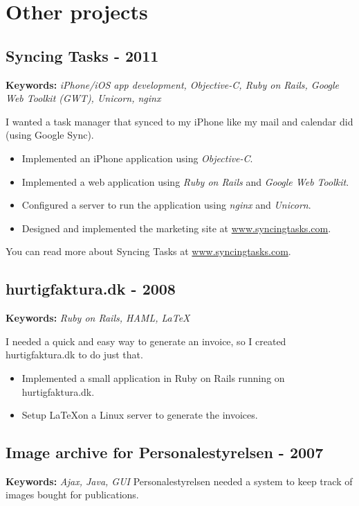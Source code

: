 \documentclass[a4paper]{article}
\newcommand{\keywords}[1]{\small\textbf{Keywords:} \emph{#1}\normalsize}
\begin{document}
\section*{Other projects}

\subsection*{Syncing Tasks - 2011}
\keywords{iPhone/iOS app development, Objective-C, Ruby on Rails, Google Web Toolkit (GWT), Unicorn, nginx}

I wanted a task manager that synced to my iPhone like my mail and calendar did (using Google Sync).

\begin{itemize}
\item Implemented an iPhone application using \emph{Objective-C}.
\item Implemented a web application using \emph{Ruby on Rails} and \emph{Google Web Toolkit}.
\item Configured a server to run the application using \emph{nginx} and \emph{Unicorn}.
\item Designed and implemented the marketing site at \href{http://www.syncingtasks.com}{www.syncingtasks.com}.
\end{itemize}

You can read more about Syncing Tasks at \href{http://www.syncingtasks.com}{www.syncingtasks.com}.
\subsection*{hurtigfaktura.dk - 2008}
\keywords{Ruby on Rails, HAML, \LaTeX}

I needed a quick and easy way to generate an invoice, so I created hurtigfaktura.dk to do just that.

\begin{itemize}
	\item Implemented a small application in Ruby on Rails running on hurtigfaktura.dk.
	\item Setup \LaTeX on a Linux server to generate the invoices.
\end{itemize}

\subsection*{Image archive for Personalestyrelsen - 2007}
\keywords{Ajax, Java, GUI}
Personalestyrelsen needed a system to keep track of images bought for publications.
\end{document}
